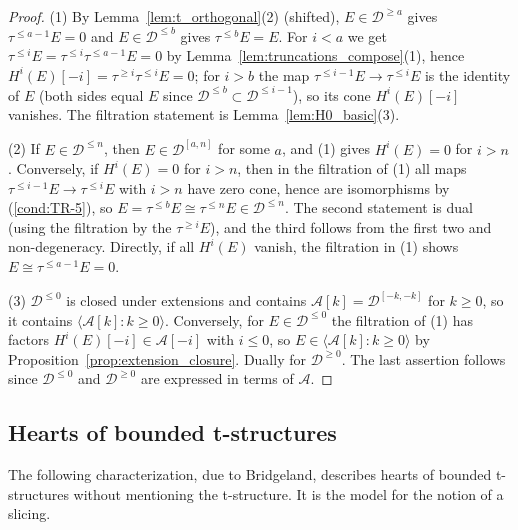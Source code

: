 \documentclass[12pt]{amsart}
\newcommand{\condref}[1]{\textup{(\ref{#1})}}
\numberwithin{theorem}{section}
\theoremstyle{definition}
\newcommand{\calA}{\mathcal{A}}
\newcommand{\calD}{\mathcal{D}}
\newcommand{\Dle}[1]{\calD^{\leqslant #1}}
\newcommand{\Dge}[1]{\calD^{\geqslant #1}}
\newcommand{\Dint}[2]{\calD^{[#1, #2]}}
\begin{document}
	\begin{proof}
		(1) By Lemma~\ref{lem:t_orthogonal}(2) (shifted), $E \in \Dge{a}$ gives $\tau^{\leqslant a-1} E = 0$ and $E \in \Dle{b}$ gives $\tau^{\leqslant b} E = E$.
		For $i < a$ we get $\tau^{\leqslant i} E = \tau^{\leqslant i} \tau^{\leqslant a-1} E = 0$ by Lemma~\ref{lem:truncations_compose}(1), hence $H^i(E)[-i] = \tau^{\geqslant i} \tau^{\leqslant i} E = 0$;
		for $i > b$ the map $\tau^{\leqslant i-1} E \to \tau^{\leqslant i} E$ is the identity of $E$ (both sides equal $E$ since $\Dle{b} \subset \Dle{i-1}$), so its cone $H^i(E)[-i]$ vanishes.
		The filtration statement is Lemma~\ref{lem:H0_basic}(3).
		
		(2) If $E \in \Dle{n}$, then $E \in \Dint{a}{n}$ for some $a$, and (1) gives $H^i(E) = 0$ for $i > n$.
		Conversely, if $H^i(E) = 0$ for $i > n$, then in the filtration of (1) all maps $\tau^{\leqslant i-1} E \to \tau^{\leqslant i} E$ with $i > n$ have zero cone, hence are isomorphisms by \condref{cond:TR-5}, so $E = \tau^{\leqslant b} E \cong \tau^{\leqslant n} E \in \Dle{n}$.
		The second statement is dual (using the filtration by the $\tau^{\geqslant i} E$), and the third follows from the first two and non-degeneracy.
		Directly, if all $H^i(E)$ vanish, the filtration in (1) shows $E \cong \tau^{\leqslant a-1} E = 0$.
		
		(3) $\Dle{0}$ is closed under extensions and contains $\calA[k] = \Dint{-k}{-k}$ for $k \geqslant 0$, so it contains $\langle \calA[k] : k \geqslant 0 \rangle$.
		Conversely, for $E \in \Dle{0}$ the filtration of (1) has factors $H^i(E)[-i] \in \calA[-i]$ with $i \leqslant 0$, so $E \in \langle \calA[k] : k \geqslant 0 \rangle$ by Proposition~\ref{prop:extension_closure}.
		Dually for $\Dge{0}$.
		The last assertion follows since $\Dle{0}$ and $\Dge{0}$ are expressed in terms of $\calA$.
	\end{proof}
	
	\subsection{Hearts of bounded t-structures}
	
	The following characterization, due to Bridgeland, describes hearts of bounded t-structures without mentioning the t-structure.
	It is the model for the notion of a slicing.
	
\end{document}
